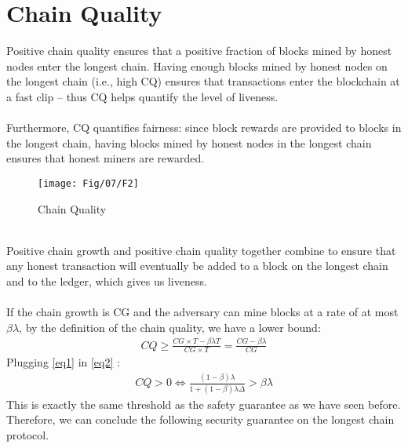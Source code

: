 \section{Chain Quality}
Positive chain quality ensures that a positive fraction of blocks mined by honest nodes enter the longest chain. Having enough blocks mined by honest nodes on the longest chain (i.e., high CQ) ensures that transactions enter the blockchain at a fast clip – thus CQ helps quantify the level of liveness.\\\\
Furthermore, CQ quantifies fairness: since block rewards are provided to blocks in the longest chain, having blocks mined by honest nodes in the longest chain ensures that honest miners are rewarded.
\begin{figure}[h!]
	\centering
	\texttt{[image: Fig/07/F2]}
	\caption{Chain Quality}
	\label{fig:l7_f2}
\end{figure}\\
Positive chain growth and positive chain quality together combine to ensure that any honest transaction will
eventually be added to a block on the longest chain and to the ledger, which gives us liveness.\\\\
If the chain growth is CG and the adversary can mine blocks at a rate of at most $\beta\lambda$, by the definition of the chain quality, we have a lower bound:
\begin{align}
	CQ \ge \frac{CG \times T - \beta\lambda T}{CG \times T} = \frac{CG - \beta\lambda}{CG}
	\label{eq2}
\end{align}
Plugging \ref{eq1} in \ref{eq2} :
\begin{align*}
	CQ > 0 \Leftrightarrow \frac{(1-\beta)\lambda}{1+(1-\beta)\lambda\Delta} > \beta\lambda
\end{align*}
This is exactly the same threshold as the safety guarantee as we have seen before. Therefore, we can conclude the following security guarantee on the longest chain protocol.

